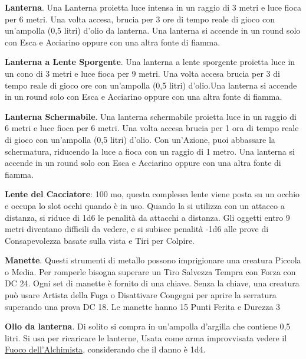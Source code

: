 \begin{multicols}{2}
\textbf{Lanterna}\label{Lanterna}\hypertarget{Lanterna}{}. Una Lanterna proietta luce intensa in un raggio di 3 metri e luce fioca per 6 metri. Una volta accesa, brucia per 3 ore di tempo reale di gioco con un'ampolla (0,5 litri) d'olio da lanterna. Una lanterna si accende in un round solo con Esca e Acciarino oppure con una altra fonte di fiamma.

\textbf{Lanterna a Lente Sporgente}. Una lanterna a lente sporgente proietta luce in un cono di 3 metri e luce fioca per 9 metri. Una volta accesa brucia per 3 di tempo reale di gioco ore con un'ampolla (0,5 litri) d'olio.Una lanterna si accende in un round solo con Esca e Acciarino oppure con una altra fonte di fiamma.

\textbf{Lanterna Schermabile}. Una lanterna schermabile proietta luce in un raggio di 6 metri e luce fioca per 6 metri. Una volta accesa brucia per 1 ora di tempo reale di gioco con un'ampolla (0,5 litri) d'olio. Con un'Azione, puoi abbassare la schermatura, riducendo la luce a fioca con un raggio di 1 metro. Una lanterna si accende in un round solo con Esca e Acciarino oppure con una altra fonte di fiamma.

\textbf{Lente del Cacciatore}: 100 mo, questa complessa lente viene posta su un occhio e occupa lo slot occhi quando è in uso. Quando la si utilizza con un attacco a distanza, si riduce di 1d6 le penalità da attacchi a distanza. Gli oggetti entro 9 metri diventano difficili da vedere, e si subisce penalità -1d6 alle prove di Consapevolezza basate sulla vista e Tiri per Colpire.

\textbf{Manette}\label{Manette}\hypertarget{Manette}{}. Questi strumenti di metallo possono imprigionare una creatura Piccola o Media. Per romperle bisogna superare un Tiro Salvezza Tempra con Forza con DC 24. Ogni set di manette è fornito di una chiave. Senza la chiave, una creatura può usare Artista della Fuga o Disattivare Congegni per aprire la serratura superando una prova DC 18. Le manette hanno 15 Punti Ferita e Durezza 3

\textbf{Olio da lanterna}\hypertarget{Olio da lanterna}{}. Di solito si compra in un'ampolla d'argilla che contiene 0,5 litri. Si usa per ricaricare le lanterne, Usata come arma improvvisata vedere il \hyperlink{Fuoco dell'Alchimista}{Fuoco dell'Alchimista}, considerando che il danno è 1d4.


\end{multicols}
